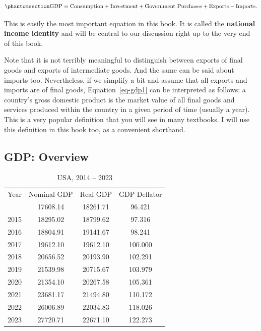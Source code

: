 \documentclass[
  letterpaper,
]{book}
\theoremstyle{plain}
\theoremstyle{remark}
\begin{document}
\begin{equation}\phantomsection\label{eq-gdp1}{
\text{GDP}=\text{Consumption}+\text{Investment}+\text{Government Purchases}+\text{Exports}-\text{Imports}.
}\end{equation}

This is easily the most important equation in this book. It is called
the \textbf{national income identity}
and will be central to our discussion right up to the very end of this
book.

Note that it is not terribly meaningful to distinguish between exports
of final goods and exports of intermediate goods. And the same can be
said about imports too. Nevertheless, if we simplify a bit and assume
that all exports and imports are of final goods, Equation~\ref{eq-gdp1}
can be interpreted as follows: a country's gross domestic product is the
market value of all final goods and services produced within the country
in a given period of time (usually a year). This is a very popular
definition that you will see in many textbooks. I will use this
definition in this book too, as a convenient shorthand.

\subsection{GDP: Overview}\label{sec-gdp-overview}

\captionsetup{labelsep=none}

\begin{longtable}{cccc}

\caption{\label{tbl-gdp-n-deflator}}

\tabularnewline

\caption*{
{\large USA, 2014 -- 2023}
} \\ 
\toprule
Year & Nominal GDP & Real GDP & GDP Deflator \\ 
\midrule\addlinespace[2.5pt]
2014 & 17608.14 & 18261.71 & 96.421 \\ 
2015 & 18295.02 & 18799.62 & 97.316 \\ 
2016 & 18804.91 & 19141.67 & 98.241 \\ 
2017 & 19612.10 & 19612.10 & 100.000 \\ 
2018 & 20656.52 & 20193.90 & 102.291 \\ 
2019 & 21539.98 & 20715.67 & 103.979 \\ 
2020 & 21354.10 & 20267.58 & 105.361 \\ 
2021 & 23681.17 & 21494.80 & 110.172 \\ 
2022 & 26006.89 & 22034.83 & 118.026 \\ 
2023 & 27720.71 & 22671.10 & 122.273 \\ 
\bottomrule

\end{longtable}
\end{document}
